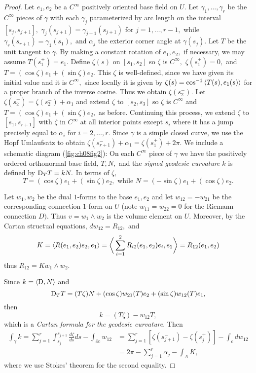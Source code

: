 \documentclass[../main]{subfiles}
\begin{document}
\begin{proof}
Let $e_1,e_2$ be a $C^\infty$ positively oriented base field on $U.$ Let $\gamma_1,\ldots,\gamma_r$ be the $C^\infty$ pieces of $\gamma$ with each $\gamma_j$ parameterized by arc length on the interval $[s_j,s_{j+1}],$ $\gamma_j(s_{j+1})=\gamma_{j+1}(s_{j+1})$ for $j=1,\ldots,r-1,$ while $\gamma_r(s_{r+1})=\gamma_1(s_1),$ and $\alpha_j$ the exterior corner angle at $\gamma(s_j).$ Let $T$ be the unit tangent to $\gamma.$ By making a constant rotation of $e_1,e_2,$ if necessary, we may assume $T(s_1^+)=e_1.$ Define $\zeta(s)$ on $[s_1,s_2]$ so $\zeta$ is $C^\infty,$ $\zeta(s_1^+)=0,$ and $T=(\cos \zeta)e_1 + (\sin \zeta)e_2.$ This $\zeta$ is well-defined, since we have given its initial value and it is $C^\infty,$ since locally it is given by $\zeta(s)=\cos^{-1} \left\langle T(s), e_1(s) \right\rangle$ for a proper branch of the inverse cosine. Thus we obtain $\zeta(s_2^-).$ Let $\zeta(s_2^+)=\zeta(s_2^-)+\alpha_1$ and extend $\zeta$ to $[s_2,s_3]$ so $\zeta$ is $C^\infty$ and $T=(\cos \zeta)e_1+ (\sin \zeta)e_2,$ as before. Continuing this process, we extend $\zeta$ to $[s_1,s_{r+1}]$ with $\zeta$ in $C^\infty$ at all interior points except $s_i$ where it has a jump precisely equal to $\alpha_i$ for $i=2,\ldots,r.$ Since $\gamma$ is a simple closed curve, we use the Hopf Umlaufsatz to obtain $\zeta(s_{r+1}^-)+\alpha_1=\zeta(s_1^+)+2\pi.$ We include a schematic diagram (\ref{fig:ch08fig2}):  On each $C^\infty$ piece of $\gamma$ we have the positively ordered orthonormal base field, $T, N,$ and the \emph{signed geodesic curvature $k$} is defined by $\mathrm{D}_T T=kN.$ In terms of $\zeta,$ \[T=(\cos \zeta)e_1 + (\sin \zeta)e_2,\text{ while }N=(-\sin \zeta)e_1+(\cos \zeta)e_2.\]

Let $w_1,w_2$ be the dual $1$-forms to the base $e_1,e_2$ and let $w_{12}=-w_{21}$ be the corresponding connection $1$-form on $U$ (note $w_{11}=w_{22}=0$ for the Riemann connection $D).$ Thus $v=w_1 \wedge w_2$ is the volume element on $U.$ Moreover, by the Cartan structual equations, $dw_{12}=R_{12},$ and \[K=\left\langle R(e_1,e_2)e_2, e_1\right\rangle  = \bigg\langle \sum_{i=1}^2 R_{i2}(e_1, e_2)e_i,e_1\bigg\rangle = R_{12}(e_1,e_2)\] thus $R_{12}=Kw_{1} \wedge w_2.$ 

Since $k= \left\langle\mathrm{D},N\right\rangle$ and \[\mathrm{D}_TT=(T\zeta)N+(\cos \zeta)w_{21}(T)e_2+(\sin \zeta)w_{12}(T)e_1,\] then
\begin{equation}\tag{2}\label{eqn:ch08.2}
    k=(T\zeta)-w_{12}T,
\end{equation}
which is a \emph{Cartan formula for the geodesic curvature}. Then
\begin{align*}
    \int_{\gamma}k = \sum_{j=1}^r \int_{s_j}^{s_{j+1}} \frac{d\zeta}{ds}ds - \int_{\partial c}w_{12} &= \sum_{j=1}^r [\zeta(s_{j+1}^-)-\zeta(s_j^+)]-\int_{c}dw_{12}\\
    &= 2\pi-\sum_{j=1}^r \alpha_j - \int_{A} K,
\end{align*}
where we use Stokes' theorem for the second equality.
\end{proof}
\end{document}
